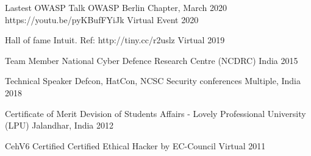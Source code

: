 



\begin{cvhonors}

  \cvhonor
    {Lastest OWASP Talk} %
    {OWASP Berlin Chapter, March 2020 https://youtu.be/pyKBufFYiJk} %
    {Virtual Event} %
    {2020} %


  \cvhonor
    {Hall of fame} %
    {Intuit. Ref: http://tiny.cc/r2uslz} %
    {Virtual} %
    {2019} %

  \cvhonor
    {Team Member} %
    {National Cyber Defence Research Centre (NCDRC)} %
    {India} %
    {2015} %

  \cvhonor
    {Technical Speaker} %
    {Defcon, HatCon, NCSC Security conferences} %
    {Multiple, India} %
    {2018} %

  \cvhonor
    {Certificate of Merit} %
    {Devision of Students Affairs - Lovely Professional University (LPU)} %
    {Jalandhar, India} %
    {2012} %
    
  \cvhonor
    {CehV6 Certified} %
    {Certified Ethical Hacker by EC-Council} %
    {Virtual} %
    {2011} %

\end{cvhonors}
